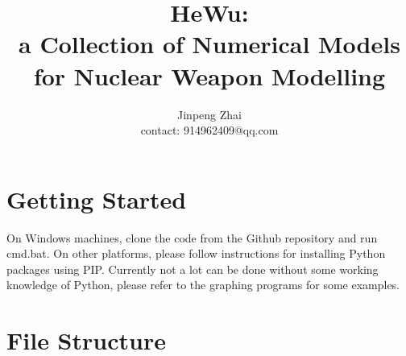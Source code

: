 \documentclass[12pt,a4paper]{report}
\author{Jinpeng Zhai \\ \small contact: 914962409@qq.com}
\title{HeWu:\large\\
a Collection of Numerical Models for Nuclear Weapon Modelling}
\begin{document}
\maketitle

\tableofcontents
\newpage
\chapter{Getting Started}
	On Windows machines, clone the code from the Github repository and run cmd.bat. On other platforms, please follow instructions for installing Python packages using PIP. Currently not a lot can be done without some working knowledge of Python, please refer to the graphing programs for some examples.
\chapter{File Structure}
\end{document}
